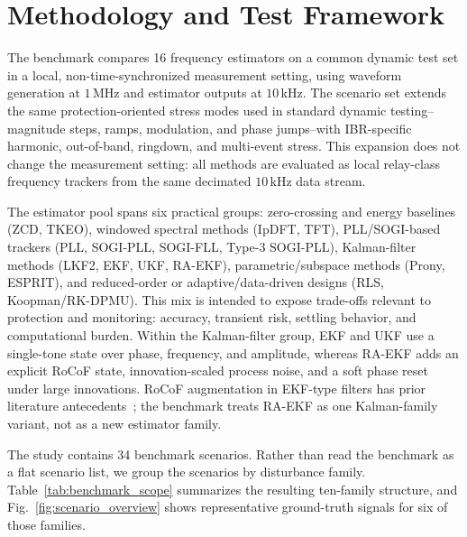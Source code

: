 \section{Methodology and Test Framework}
\label{sec:methodology}

The benchmark compares 16 frequency estimators on a common dynamic test set in
a local, non-time-synchronized measurement setting, using waveform generation
at $1$\,MHz and estimator outputs at $10$\,kHz. The scenario set extends the
same protection-oriented stress modes used in standard dynamic
testing--magnitude steps, ramps, modulation, and phase jumps--with
IBR-specific harmonic, out-of-band, ringdown, and multi-event stress. This
expansion does not change the measurement setting: all methods are evaluated as
local relay-class frequency trackers from the same decimated $10$\,kHz data
stream.

The estimator pool spans six practical groups: zero-crossing and energy
baselines (ZCD, TKEO), windowed spectral methods (IpDFT, TFT), PLL/SOGI-based
trackers (PLL, SOGI-PLL, SOGI-FLL, Type-3 SOGI-PLL), Kalman-filter methods
(LKF2, EKF, UKF, RA-EKF), parametric/subspace methods (Prony, ESPRIT), and
reduced-order or adaptive/data-driven designs (RLS, Koopman/RK-DPMU). This mix
is intended to expose trade-offs relevant to protection and monitoring:
accuracy, transient risk, settling behavior, and computational burden. Within
the Kalman-filter group, EKF and UKF use a single-tone state over phase,
frequency, and amplitude, whereas RA-EKF adds an explicit RoCoF state,
innovation-scaled process noise, and a soft phase reset under large
innovations. RoCoF augmentation in EKF-type filters has prior literature
antecedents~\cite{Ferrero2020EKF,Chamorro2021}; the benchmark treats RA-EKF as
one Kalman-family variant, not as a new estimator family.

The study contains 34 benchmark scenarios. Rather than read the benchmark as a
flat scenario list, we group the scenarios by disturbance family.
Table~\ref{tab:benchmark_scope} summarizes the resulting ten-family structure,
and Fig.~\ref{fig:scenario_overview} shows representative ground-truth signals
for six of those families.

